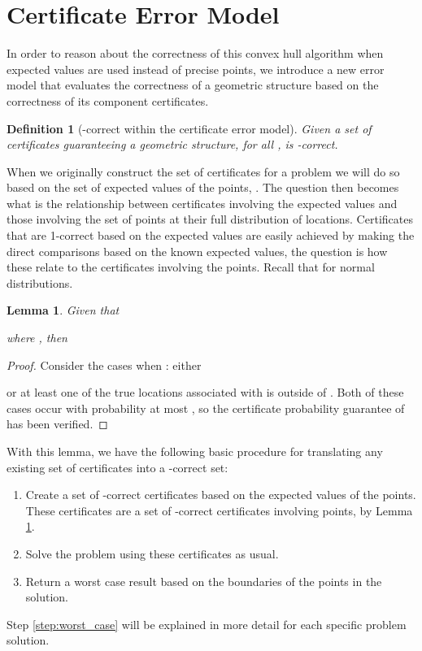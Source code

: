 \documentclass[11pt]{article}
\newtheorem{lemma}{\textbf{Lemma}}[section]
\newtheorem{definition}[theorem]{Definition}
\begin{document}
 \section{Certificate Error Model}
\label{certificate_error_model}
In order to reason about the correctness of this convex hull algorithm when expected values are used instead of precise points, we introduce a new error model that evaluates the correctness of a geometric structure based on the correctness of its component certificates.

\begin{definition}[-correct within the certificate error model]
  Given a set of certificates  guaranteeing a
  geometric structure, for all ,  is
  -correct.
\end{definition}

When we originally construct the set of certificates for a problem we will do so based on the set of expected values of the points, .  The question then becomes what is the relationship between certificates involving the expected values and those involving the set of points at their full distribution of locations.  Certificates that are 1-correct based on the expected values are easily achieved by making the direct comparisons based on the known expected values, the question is how these relate to the certificates involving the points. 
Recall that  for normal distributions.

\begin{lemma}
\label{lem:expected_to_phi} Given that 

where , then

\end{lemma}

\begin{proof}
  Consider the cases when : either
  
  or at least one of the true locations  associated with  is outside of
  .  Both of these cases occur with probability at most , so the certificate probability guarantee of  has been verified.
\end{proof}

With this lemma, we have the following basic procedure for translating any existing set of certificates into a -correct set:
\begin{enumerate}
\item Create a set of -correct certificates based on the expected values of the points.  These certificates are a set of -correct certificates involving points, by Lemma \ref{lem:expected_to_phi}.
\item Solve the problem using these certificates as usual.
\item \label{step:worst_case} Return a worst case result based on the boundaries of the points in the solution.
\end{enumerate}
Step \ref{step:worst_case} will be explained in more detail for each specific problem solution.
\end{document}
